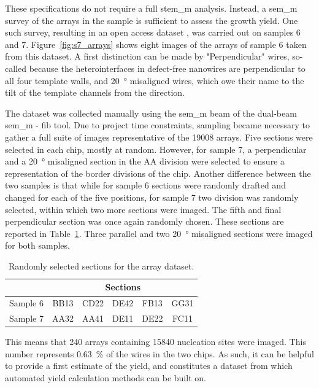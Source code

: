 These specifications do not require a full \acs{stem_m} analysis. Instead, a \acs{sem_m} survey of the arrays in the sample is sufficient to assess the growth yield. One such survey, resulting in an open access dataset \cite{dataset}, was carried out on samples 6 and 7. Figure~\ref{fig:s7_arrays} shows eight images of the arrays of sample 6 taken from this dataset. A first distinction can be made by "Perpendicular" wires, so-called because the heterointerfaces in defect-free nanowires are perpendicular to all four template walls, and \qty{20}{\degree} misaligned wires, which owe their name to the tilt of the template channels from the  direction.

The dataset was collected manually using the \acs{sem_m} beam of the dual-beam \acs{sem_m} - \acs{fib} tool. Due to project time constraints, sampling became necessary to gather a full suite of images representative of the \num{19008} arrays. Five sections were selected in each chip, mostly at random. However, for sample 7, a perpendicular and a \qty{20}{\degree} misaligned section in the AA division were selected to ensure a representation of the border divisions of the chip. Another difference between the two samples is that while for sample 6 sections were randomly drafted and changed for each of the five positions, for sample 7 two division was randomly selected, within which two more sections were imaged. The fifth and final perpendicular section was once again randomly chosen. These sections are reported in Table~\ref{tab:dataset_sections}. Three parallel and two \qty{20}{\degree} misaligned sections were imaged for both samples.

\begin{table}
    \centering
    \caption{Randomly selected sections for the array dataset.}
    \begin{tabular}{c|c c c c c}
         & \multicolumn{5}{c}{Sections} \\ \hline
        Sample 6 & BB13 & CD22 & DE42 & FB13 & GG31 \\
        Sample 7 & AA32 & AA41 & DE11 & DE22 & FC11 \\ \hline \hline
    \end{tabular}
    \label{tab:dataset_sections}
\end{table}

This means that \num{240} arrays containing \num{15840} nucleation sites were imaged. This number represents \qty{0.63}{\percent} of the wires in the two chips. As such, it can be helpful to provide a first estimate of the yield, and constitutes a dataset from which automated yield calculation methods can be built on.

